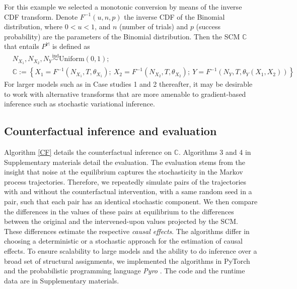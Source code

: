\documentclass{article}
\begin{document}
For this example we selected a monotonic conversion by means of the inverse CDF transform. Denote $F^{-1}(u, n, p)$ the inverse CDF of the Binomial distribution, where $0< u <1$, and $n$ (number of trials) and $p$ (success probability) are the parameters of the Binomial distribution.
Then the SCM $\mathbb{C}$ that entails $P^{\mathbb{M}}$ is defined as
\vspace{-.15in}
\begin{eqnarray}
& N_{X_1}, N_{X_2}, N_{Y} \overset{\text{ind}}{\sim} \text{Uniform}(0, 1); &\\ 
& \mathbb{C} := \left\{
X_1 = F^{-1}(N_{X_1}, T, \theta_{X_1});\ 
X_2 =  F^{-1}(N_{X_2}, T, \theta_{X_2});  \ 
Y = F^{-1}(N_{Y}, T,\theta_{Y}(X_1, X_2)) \right\}  \nonumber &
\label{toy_scm_model}
\end{eqnarray}
For larger models such as in Case studies 1 and 2 thereafter, it may be desirable to work with alternative transforms that are more amenable to gradient-based inference such as stochastic variational inference.




\subsection{Counterfactual inference and evaluation} 

Algorithm \ref{CF} details the counterfactual inference on $\mathbb{C}$. Algorithms 3 and 4 in Supplementary materials detail the evaluation. The evaluation stems from the insight that noise at the equilibrium captures the stochasticity in the Markov process trajectories. Therefore, we repeatedly simulate pairs of the trajectories with and without the counterfactual intervention, with a same random seed in a pair, such that each pair has an identical stochastic component. We then compare the differences in the values of these pairs at equilibrium to the differences between the original and the intervened-upon values projected by the SCM. These differences estimate the respective {\it causal effects}. The algorithms differ in choosing a deterministic or a stochastic approach for the estimation of causal effects. To ensure scalability to large models and the ability to do inference over a broad set of structural assignments, we implemented the algorithms in PyTorch and the probabilistic programming language {\it Pyro} \cite{bingham2018pyro}. The code and the runtime data are in Supplementary materials.
\end{document}
